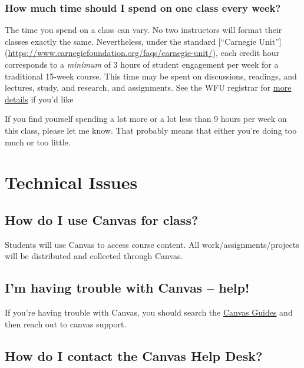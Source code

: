 \documentclass[
]{book}
\begin{document}
\subsubsection{How much time should I spend on one class every week?}\label{how-much-time-should-i-spend-on-one-class-every-week-1}

The time you spend on a class can vary. No two instructors will format their classes exactly the same. Nevertheless, under the standard {[}``Carnegie Unit''{]} (\url{https://www.carnegiefoundation.org/faqs/carnegie-unit/}), each credit hour corresponds to a \emph{minimum} of 3 hours of student engagement per week for a traditional 15-week course. This time may be spent on discussions, readings, and lectures, study, and research, and assignments. See the WFU registrar for \href{https://registrar.wfu.edu/semester-credit-hour/}{more details} if you'd like

If you find yourself spending a lot more or a lot less than 9 hours per week on this class, please let me know. That probably means that either you're doing too much or too little.

\section{Technical Issues}\label{tech}

\subsection{How do I use Canvas for class?}\label{how-do-i-use-canvas-for-class}

Students will use Canvas to access course content. All work/assignments/projects will be distributed and collected through Canvas.

\subsection{I'm having trouble with Canvas -- help!}\label{im-having-trouble-with-canvas-help}

If you're having trouble with Canvas, you should search the \href{https://community.canvaslms.com/t5/Canvas-Basics-Guide/tkb-p/basics}{Canvas Guides} and then reach out to canvas support.

\subsection{How do I contact the Canvas Help Desk?}\label{how-do-i-contact-the-canvas-help-desk}
\end{document}
